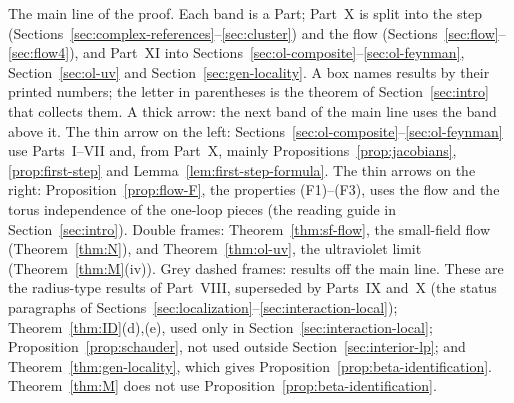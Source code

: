 \begin{gfigure}[p]
\caption{The main line of the proof. Each band is a Part; Part~X is split into the step (Sections~\ref{sec:complex-references}--\ref{sec:cluster}) and the flow (Sections~\ref{sec:flow}--\ref{sec:flow4}), and Part~XI into Sections~\ref{sec:ol-composite}--\ref{sec:ol-feynman}, Section~\ref{sec:ol-uv} and Section~\ref{sec:gen-locality}. A box names results by their printed numbers; the letter in parentheses is the theorem of Section~\ref{sec:intro} that collects them. A thick arrow: the next band of the main line uses the band above it. The thin arrow on the left: Sections~\ref{sec:ol-composite}--\ref{sec:ol-feynman} use Parts~I--VII and, from Part~X, mainly Propositions~\ref{prop:jacobians}, \ref{prop:first-step} and Lemma~\ref{lem:first-step-formula}. The thin arrows on the right: Proposition~\ref{prop:flow-F}, the properties (F1)--(F3), uses the flow and the torus independence of the one-loop pieces (the reading guide in Section~\ref{sec:intro}). Double frames: Theorem~\ref{thm:sf-flow}, the small-field flow (Theorem~\ref{thm:N}), and Theorem~\ref{thm:ol-uv}, the ultraviolet limit (Theorem~\ref{thm:M}(iv)). Grey dashed frames: results off the main line. These are the radius-type results of Part~VIII, superseded by Parts~IX and~X (the status paragraphs of Sections~\ref{sec:localization}--\ref{sec:interaction-local}); Theorem~\ref{thm:ID}(d),(e), used only in Section~\ref{sec:interaction-local}; Proposition~\ref{prop:schauder}, not used outside Section~\ref{sec:interior-lp}; and Theorem~\ref{thm:gen-locality}, which gives Proposition~\ref{prop:beta-identification}. Theorem~\ref{thm:M} does not use Proposition~\ref{prop:beta-identification}.}
\label{fig:G-mainline}
\end{gfigure}
